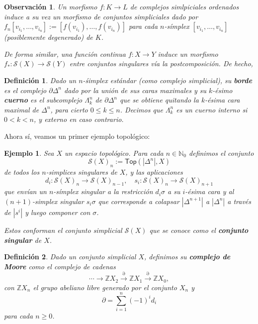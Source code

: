 \documentclass[11pt]{report}
\theoremstyle{colored}
\newtheorem{definition}{Definición}[section]
\newtheorem{remark}{Observación}[section]
\newtheorem{example}{Ejemplo}[section]
\newcommand{\N}{\mathbb{N}}
\newcommand{\Z}{\mathbb{Z}}
\newcommand{\cat}[1]{\mathsf{#1}}
\renewcommand{\ss}[1]{\Delta^{#1}}
\newcommand{\bss}[1]{\partial \ss{n}}
\newcommand{\horn}[2]{\Lambda^{#1}_{#2}}
\begin{document}
\begin{remark} Un morfismo $f : K \to L$ de complejos simlpiciales ordenados induce a su vez un morfismo de conjuntos simpliciales dado por $f_n[v_{i_1}, \dots, v_{i_n}] := [f(v_{i_1}), \dots, f(v_{i_n})]$ para cada $n$-símplex $[v_{i_1}, \dots, v_{i_n}]$ (posiblemente degenerado) de $K$.

De forma similar, una función continua $f : X \to Y$ induce un morfismo $f_* : \mathcal{S}(X) \to \mathcal{S}(Y)$ entre conjuntos singulares vía la postcomposición. De hecho, 
\end{remark}

\begin{definition} Dado un $n$-śimplex estándar (como complejo simplicial), su \textbf{borde} es el complejo $\bss{n}$ dado por la unión de sus caras maximales y su $k$-ésimo \textbf{cuerno} es el subcomplejo $\horn{n}{k}$ de $\bss{n}$ que se obtiene quitando la $k$-ésima cara maximal de $\ss{n}$, para cierto $0 \leq k \leq n$. Decimos que $\horn{n}{k}$ es un cuerno \textit{interno} si $0 < k < n$, y \textit{externo} en caso contrario.
\end{definition}

Ahora sí, veamos un primer ejemplo topológico:

\begin{example} Sea $X$ un espacio topológico. Para cada $n \in \N_0$ definimos el conjunto
\[
\mathcal{S}(X)_n := \cat{Top}(|\ss{n}|,X)
\]
de todos los $n$-simplices singulares de $X$, y las aplicaciones 
\[
d_i : \mathcal{S}(X)_n \to \mathcal{S}(X)_{n-1}, \quad
s_i : \mathcal{S}(X)_n \to \mathcal{S}(X)_{n+1}
\]
que envían un $n$-símplex singular a la restricción $d_i\sigma$ a su $i$-ésima cara y al $(n+1)$-simplex singular $s_i\sigma$ que corresponde a colapsar $|\ss{n+1}|$ a $|\ss{n}|$ a través de $|s^i|$ y luego componer con $\sigma$.

Estos conforman el conjunto simplicial $\mathcal{S}(X)$ que se conoce como el \textbf{conjunto singular} de $X$.
\end{example}

\begin{definition} Dado un conjunto simplicial $X$, definimos su \textbf{complejo de Moore} como el complejo de cadenas
\[
\cdots \to \Z X_2 \xrightarrow{\partial} \Z X_1 \xrightarrow{\partial} \Z X_0,
\]
con $\Z X_n$ el grupo abeliano libre generado por el conjunto $X_n$ y 
\[
\partial = \sum_{i=1}^n(-1)^i d_i
\]
para cada $n \geq 0$.
\end{definition}
\end{document}

